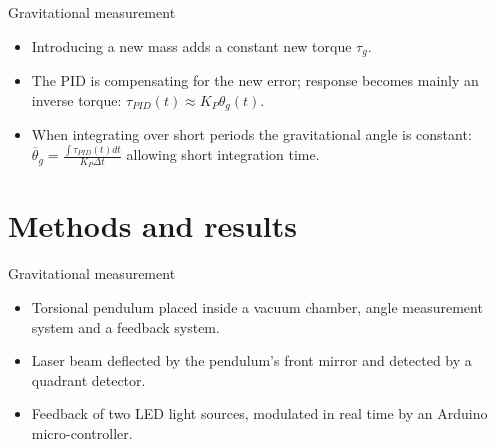 \documentclass{beamer}
\begin{document}
\begin{frame}{\hypertarget{frame:Gravimetric measurement}{Gravitational measurement}}
	\begin{itemize}
		
		
		\pause
		\item Introducing a new mass adds a constant new torque $\tau_g$. 
		\item The PID is compensating for the new error; response becomes mainly an inverse torque: $\tau_{PID}(t) \approx K_P\theta_g(t)$. 
		\item When integrating over short periods the gravitational angle is constant: $\overline{\theta}_g =  \frac{\int \tau_{PID}(t) dt}{ K_P \Delta t} $ allowing short integration time.
		
		
	\end{itemize}
\end{frame}

\section{Methods and results}
\begin{frame}{Gravitational measurement}
	\begin{itemize}
		\framesubtitle{Study achievements}
		
		\item Torsional pendulum placed inside a vacuum chamber, angle measurement system and a feedback system. 
		\item Laser beam deflected by the pendulum's front mirror and detected by a quadrant detector.
		\pause
		\item Feedback of two LED light sources, modulated in real time by an Arduino micro-controller.
		
		
	\end{itemize}
\end{frame}
\end{document}
